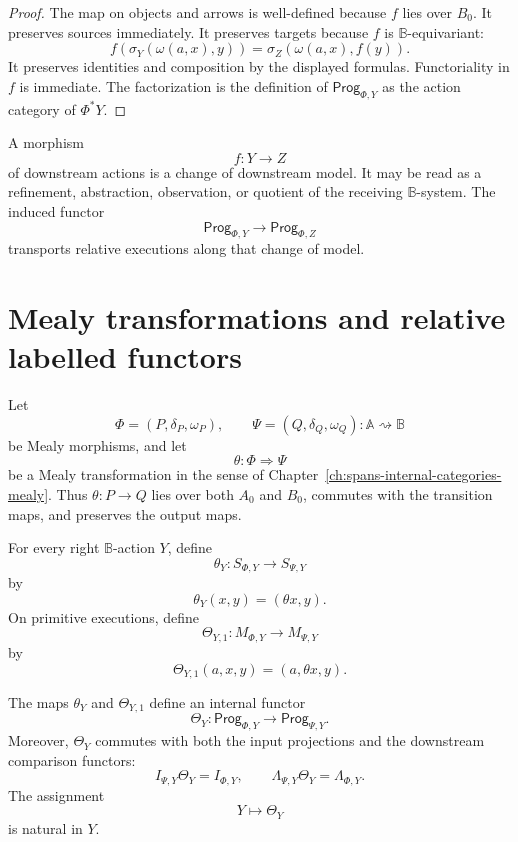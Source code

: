 \begin{proof}
The map on objects and arrows is well-defined because \(f\) lies over \(B_0\).
It preserves sources immediately. It preserves targets because \(f\) is
\(\mathbb B\)-equivariant:
\[
f(\sigma_Y(\omega(a,x),y))
=
\sigma_Z(\omega(a,x),f(y)).
\]
It preserves identities and composition by the displayed formulas. Functoriality
in \(f\) is immediate. The factorization is the definition of
\(\mathsf{Prog}_{\Phi,Y}\) as the action category of \(\Phi^\ast Y\).
\end{proof}

\begin{remark}
\label{rem:change-of-downstream-model}
A morphism
\[
f:Y\to Z
\]
of downstream actions is a change of downstream model. It may be read as a
refinement, abstraction, observation, or quotient of the receiving
\(\mathbb B\)-system. The induced functor
\[
\mathsf{Prog}_{\Phi,Y}\to\mathsf{Prog}_{\Phi,Z}
\]
transports relative executions along that change of model.
\end{remark}

\section{Mealy transformations and relative labelled functors}
\label{sec:mealy-transformations-relative-labelled-functors}

Let
\[
\Phi=(P,\delta_P,\omega_P),
\qquad
\Psi=(Q,\delta_Q,\omega_Q)
:
\mathbb A\rightsquigarrow\mathbb B
\]
be Mealy morphisms, and let
\[
\theta:\Phi\Rightarrow\Psi
\]
be a Mealy transformation in the sense of
Chapter~\ref{ch:spans-internal-categories-mealy}. Thus \(\theta:P\to Q\) lies
over both \(A_0\) and \(B_0\), commutes with the transition maps, and preserves
the output maps.

\begin{definition}
\label{def:relative-functor-induced-mealy-transformation}
For every right \(\mathbb B\)-action \(Y\), define
\[
\theta_Y:S_{\Phi,Y}\to S_{\Psi,Y}
\]
by
\[
\theta_Y(x,y)=(\theta x,y).
\]
On primitive executions, define
\[
\Theta_{Y,1}:M_{\Phi,Y}\to M_{\Psi,Y}
\]
by
\[
\Theta_{Y,1}(a,x,y)=(a,\theta x,y).
\]
\end{definition}

\begin{proposition}
\label{prop:relative-functoriality-mealy-transformations}
The maps \(\theta_Y\) and \(\Theta_{Y,1}\) define an internal functor
\[
\Theta_Y:
\mathsf{Prog}_{\Phi,Y}\to\mathsf{Prog}_{\Psi,Y}.
\]
Moreover, \(\Theta_Y\) commutes with both the input projections and the
downstream comparison functors:
\[
I_{\Psi,Y}\Theta_Y=I_{\Phi,Y},
\qquad
\Lambda_{\Psi,Y}\Theta_Y=\Lambda_{\Phi,Y}.
\]
The assignment
\[
Y\longmapsto \Theta_Y
\]
is natural in \(Y\).
\end{proposition}

